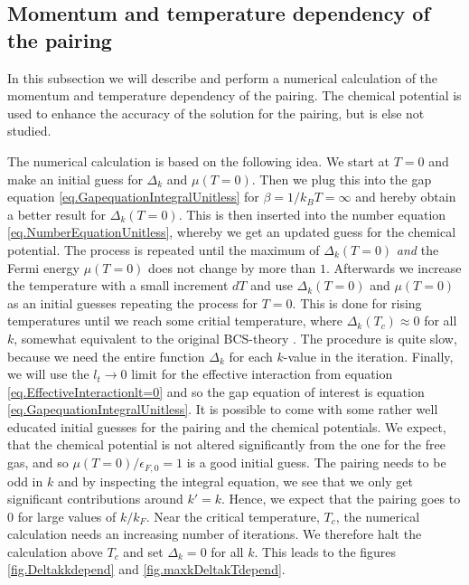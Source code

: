 \subsection{Momentum and temperature dependency of the pairing}
\label{subsec.momentum_and_temperature_pairing_singlewire}
In this subsection we will describe and perform a numerical calculation of the momentum and temperature dependency of the pairing. The chemical potential is used to enhance the accuracy of the solution for the pairing, but is else not studied. 

The numerical calculation is based on the following idea. We start at $T = 0$ and make an initial guess for $\Delta_k$ and $\mu(T=0)$. Then we plug this into the gap equation \eqref{eq.GapequationIntegralUnitless} for $\beta = 1/k_BT = \infty$ and hereby obtain a better result for $\Delta_k(T=0)$. This is then inserted into the number equation \eqref{eq.NumberEquationUnitless}, whereby we get an updated guess for the chemical potential. The process is repeated until the maximum of $\Delta_k(T=0)$ \textit{and} the Fermi energy $\mu( T=0 )$ does not change by more than $1$\textperthousand. Afterwards we increase the temperature with a small increment $dT$ and use $\Delta_k(T=0)$ and $\mu( T=0 )$ as an initial guesses repeating the process for $T=0$. This is done for rising temperatures until we reach some critial temperature, where $\Delta_k(T_c)\approx 0$ for all $k$, somewhat equivalent to the original BCS-theory \cite[chapter 3]{Tinkham}. The procedure is quite slow, because we need the entire function $\Delta_k$ for each $k$-value in the iteration. Finally, we will use the $l_t \to 0$ limit for the effective interaction from equation \eqref{eq.EffectiveInteractionlt=0} and so the gap equation of interest is equation \eqref{eq.GapequationIntegralUnitless}. It is possible to come with some rather well educated initial guesses for the pairing and the chemical potentials. We expect, that the chemical potential is not altered significantly from the one for the free gas, and so $\mu(T = 0)/\epsilon_{F,0} = 1$ is a good initial guess. The pairing needs to be odd in $k$ and by inspecting the integral equation, we see that we only get significant contributions around $k' = k$. Hence, we expect that the pairing goes to 0 for large values of $k/k_F$. Near the critical temperature, $T_c$, the numerical calculation needs an increasing number of iterations. We therefore halt the calculation above $T_c$ and set $\Delta_k = 0$ for all $k$. This leads to the figures \ref{fig.Deltakkdepend} and \ref{fig.maxkDeltakTdepend}. 

